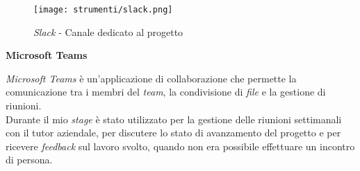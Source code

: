 \begin{figure}[H]
    \label{fig:slack} 
    \centering
    \texttt{[image: strumenti/slack.png]}
    \caption{\textit{Slack} - Canale dedicato al progetto}
\end{figure}

\noindent \textbf{Microsoft Teams\\}

\noindent \textit{Microsoft Teams} è un'applicazione di collaborazione che permette la comunicazione tra i membri del \textit{team}, la condivisione di \textit{file} e la gestione di riunioni.\\
Durante il mio \textit{stage} è stato utilizzato per la gestione delle riunioni settimanali con il tutor aziendale, per discutere lo stato di avanzamento del progetto e per ricevere \textit{feedback} sul lavoro svolto, quando
non era possibile effettuare un incontro di persona.
